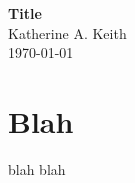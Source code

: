 \documentclass[10pt]{article}
\begin{document}
{\selectfont

\begin{center}
\large{
\textbf{
Title} \\
Katherine A. Keith \\
\today
}
\end{center}

\section{Blah}
blah blah


 
}
\end{document}
